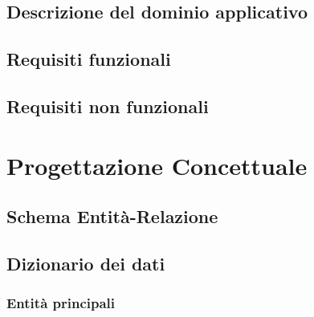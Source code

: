 \documentclass[12pt, a4paper, twoside, openright]{article}
\begin{document}
\subsection{Descrizione del dominio applicativo}


\subsection{Requisiti funzionali}


\subsection{Requisiti non funzionali}


\newpage

\section{Progettazione Concettuale}
\minitoc
\vspace{1cm}

\subsection{Schema Entità-Relazione}


\subsection{Dizionario dei dati}

\subsubsection{Entità principali}
\end{document}
